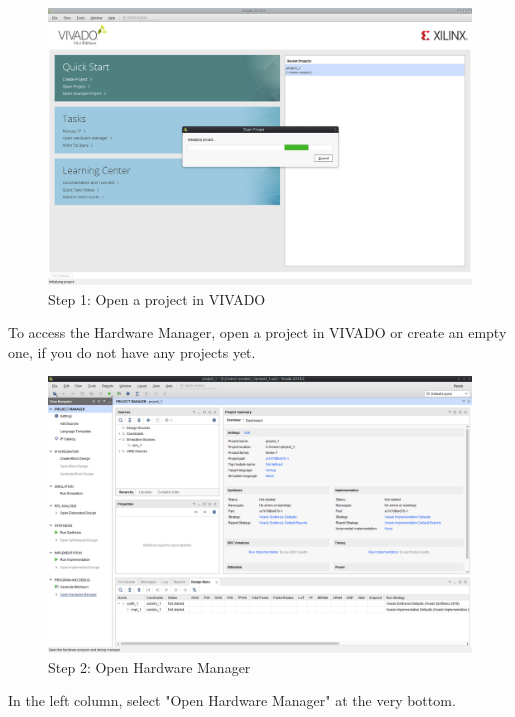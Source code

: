 \begin{figure}
  \includegraphics[width=\linewidth]{images/vivado01.png}
  \caption{Step 1: Open a project in VIVADO}
  \label{fig:vivado01}
\end{figure}

To access the Hardware Manager, open a project in VIVADO or create an empty one, if you do not have any projects yet.

\begin{figure}
  \includegraphics[width=\linewidth]{images/vivado02.png}
  \caption{Step 2: Open Hardware Manager}
  \label{fig:vivado02}
\end{figure}

In the left column, select "Open Hardware Manager" at the very bottom.

